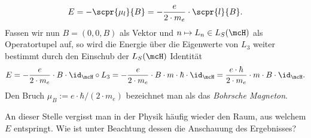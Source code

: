 \documentclass{subfile}
\begin{document}
                \[
                    E = -\scpr{\mu_l}{B} = -\frac{e}{2\cdot m_e}\cdot\scpr{l}{B}.
                \]
                Fassen wir nun $B = (0,0,B)$ als Vektor und $n\mapsto L_n\in L_S(\mcH)$ als Operatortupel auf, so wird die Energie über die Eigenwerte von $L_3$ weiter bestimmt durch den Einschub der $L_S(\mcH)$ Identität
                \[
                    E = -\frac{e}{2\cdot m_e}\cdot B\cdot\id_\mcH\circ L_3 = -\frac{e}{2\cdot m_e}\cdot B\cdot m\cdot\hbar\cdot\id_\mcH = \frac{e\cdot\hbar}{2\cdot m_e}\cdot m\cdot B\cdot\id_\mcH. 
                \]
                Den Bruch $\mu_B := e\cdot\hbar/(2\cdot m_e)$ bezeichnet man als das \emph{Bohrsche Magneton}. 
                \begin{Aufgabe}
                    \nr{} An dieser Stelle vergisst man in der Physik häufig wieder den Raum, aus welchem $E$ entspringt. Wie ist unter Beachtung dessen die Anschauung des Ergebnisses?
                \end{Aufgabe}
\end{document}
